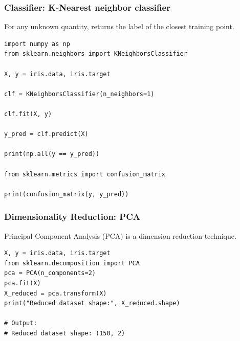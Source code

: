 








\begin{frame}[fragile]\frametitle{Classifier: K-Nearest neighbor classifier}
For any unknown quantity, returns the label of the closest training point.

\begin{lstlisting}
import numpy as np
from sklearn.neighbors import KNeighborsClassifier

X, y = iris.data, iris.target

clf = KNeighborsClassifier(n_neighbors=1)

clf.fit(X, y)

y_pred = clf.predict(X)

print(np.all(y == y_pred))

from sklearn.metrics import confusion_matrix

print(confusion_matrix(y, y_pred))
\end{lstlisting}
\end{frame}



\begin{frame}[fragile]\frametitle{Dimensionality Reduction: PCA}
Principal Component Analysis (PCA) is a dimension reduction technique.
\begin{lstlisting}
X, y = iris.data, iris.target
from sklearn.decomposition import PCA
pca = PCA(n_components=2)
pca.fit(X)
X_reduced = pca.transform(X)
print("Reduced dataset shape:", X_reduced.shape)

# Output:
# Reduced dataset shape: (150, 2)
\end{lstlisting}
%
%
%
\end{frame}

